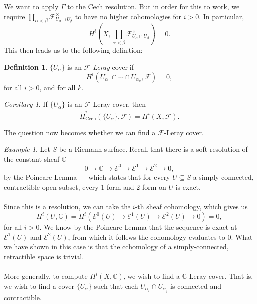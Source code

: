 \documentclass[a4paper]{report}
\theoremstyle{definition}
\newtheorem{definition}{Definition}
\theoremstyle{remark}
\theoremstyle{proposition}
\theoremstyle{conjecture}
\theoremstyle{lemma}
\theoremstyle{corollary}
\newtheorem{corollary}{Corollary}
\theoremstyle{exercise}
\theoremstyle{example}
\newtheorem{example}{Example}
\newcommand{\C}{\mathbb{C}}
\newcommand{\mcal}{\mathcal}
\newcommand{\on}{\operatorname}
\begin{document}
We want to apply $\Gamma$ to the Cech resolution. But in order for this to work,
we require $\prod_{\alpha < \beta} \mcal{F}_{U_\alpha \cap U_\beta}^\times$
to have no higher cohomologies for $i>0$. In particular, 
$$H^i\left(X, \prod_{\alpha<\beta}\mcal{F}_{U_\alpha \cap U_\beta}^\times\right) = 0.$$
This then leads us to the following definition:

\begin{definition}
    $\lbrace U_\alpha\rbrace$ is an \emph{$\mcal{F}$-Leray} cover if 
    $$H^i (U_{\alpha_1}\cap \cdots \cap U_{\alpha_k}, \mcal{F}) = 0,$$
    for all $i > 0$, and for all $k$.
\end{definition}

\begin{corollary}
    If $\lbrace U_\alpha\rbrace$ is an $\mcal{F}$-Leray cover, then 
    $$\check{H}_{\on{Cech}}^i (\lbrace U_\alpha\rbrace,\mcal{F}) = H^i(X,\mcal{F}).$$
\end{corollary}

The question now becomes whether we can find a $\mcal{F}$-Leray cover.

\begin{example}
    Let $S$ be a Riemann surface.
    Recall that there is a soft resolution of the constant sheaf 
    $\underline{\C}$ 
    $$0\longrightarrow \underline{\C} \longrightarrow \mcal{E}^0 \longrightarrow \mcal{E}^1 \longrightarrow \mcal{E}^2 \longrightarrow 0,$$
    by the Poincare Lemma --- which states that for every $U\subseteq S$ a
    simply-connected, contractible open subset, every $1$-form and $2$-form
    on $U$ is exact.\\\\
    Since this is a resolution, we can take the $i$-th sheaf cohomology, which
    gives us 
    $$H^i(U,\underline{\C}) = H^i\left(\mcal{E}^0(U) \to \mcal{E}^1(U) \to \mcal{E}^2(U) \to 0\right) = 0,$$
    for all $i > 0$. We know by the Poincare Lemma that the 
    sequence is exact at $\mcal{E}^1(U)$ and $\mcal{E}^2(U)$, from which
    it follows the cohomology evaluates to $0$. What we have shown in this case 
    is that the cohomology of a simply-connected, retractible space 
    is trivial.\\\\
    More generally, to compute $H^i(X,\underline{\C})$, we wish to find a 
    $\underline{\C}$-Leray cover. That is, we wish to find a cover 
    $\lbrace U_\alpha\rbrace$ such that each $U_{\alpha_i}\cap U_{\alpha_j}$ 
    is connected and contractible.
\end{example}
\end{document}
